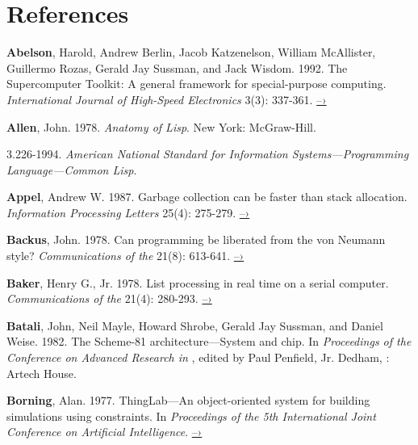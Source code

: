 \chapter*{References}
\label{References}


 \label{Abelson et al. 1992}
\textbf{Abelson}, Harold, Andrew Berlin, Jacob Katzenelson, William McAllister,
Guillermo Rozas, Gerald Jay Sussman, and Jack Wisdom. 1992.  The Supercomputer
Toolkit: A general framework for special-purpose computing.
\textit{International Journal of High-Speed Electronics} 3(3): 337-361.
\href{http://www.hpl.hp.com/techreports/94/HPL-94-30.html}{–›}

 \label{Allen 1978}
\textbf{Allen}, John.  1978.  \textit{Anatomy of Lisp}. New York: McGraw-Hill.

 \label{ANSI 1994}
 3.226-1994. \textit{American National Standard for Information
Sys\-tems---Programming Language---Common Lisp}.

 \label{Appel 1987}
\textbf{Appel}, Andrew W.  1987.  Garbage collection can be faster than stack
allocation.  \textit{Information Processing Letters} 25(4): 275-279.
\href{https://www.cs.princeton.edu/~appel/papers/45.ps}{–›}

 \label{Backus 1978}
\textbf{Backus}, John.  1978.  Can programming be liberated from the von Neumann style?
\textit{Communications of the } 21(8): 613-641.
\href{http://worrydream.com/refs/Backus-CanProgrammingBeLiberated.pdf}{–›}

 \label{Baker (1978)}
\textbf{Baker}, Henry G., Jr.  1978.  List processing in real time on a serial computer.
\textit{Communications of the } 21(4): 280-293.
\href{http://dspace.mit.edu/handle/1721.1/41976}{–›}

 \label{Batali et al. 1982}
\textbf{Batali}, John, Neil Mayle, Howard Shrobe, Gerald Jay Sussman, and Daniel Weise.
1982.  The Scheme-81 architecture---System and chip.  In \textit{Proceedings of
the  Conference on Advanced Research in }, edited by
Paul Penfield, Jr. Dedham, : Artech House.

 \label{Borning (1977)}
\textbf{Borning}, Alan.  1977.  ThingLab---An object-oriented system for building
simulations using constraints. In \textit{Proceedings of the 5th International
Joint Conference on Artificial Intelligence}.
\href{http://ijcai.org/Past\%20Proceedings/IJCAI-77-VOL1/PDF/085.pdf}{–›}


